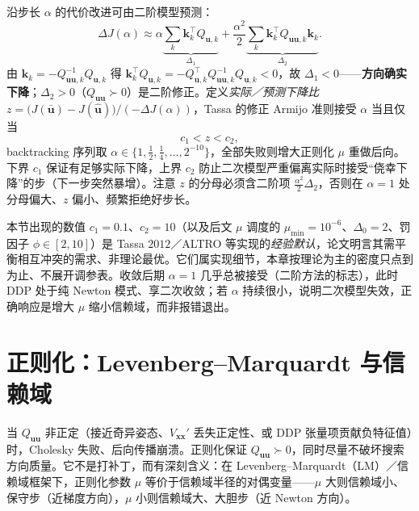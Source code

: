 沿步长 $\alpha$ 的代价改进可由二阶模型预测：
\begin{equation}
  \Delta J(\alpha)\approx\alpha\underbrace{\textstyle\sum_k\mathbf{k}_k^\top Q_{\mathbf{u},k}}_{\Delta_1}+\frac{\alpha^2}{2}\underbrace{\textstyle\sum_k\mathbf{k}_k^\top Q_{\mathbf{uu},k}\mathbf{k}_k}_{\Delta_2}.
  \label{eq:ddp-deltaJ}
\end{equation}
由 $\mathbf{k}_k=-Q_{\mathbf{uu},k}^{-1}Q_{\mathbf{u},k}$ 得 $\mathbf{k}_k^\top Q_{\mathbf{u},k}=-Q_{\mathbf{u},k}^\top Q_{\mathbf{uu},k}^{-1}Q_{\mathbf{u},k}<0$，故 $\Delta_1<0$——\textbf{方向确实下降}；$\Delta_2>0$（$Q_{\mathbf{uu}}\succ0$）是二阶修正。定义\emph{实际／预测下降比} $z=\big(J(\bar{\mathbf{u}})-J(\hat{\mathbf{u}})\big)/(-\Delta J(\alpha))$，Tassa 的修正 Armijo 准则\cite{tassa2012ilqg}接受 $\alpha$ 当且仅当
\begin{equation}
  c_1<z<c_2,
  \label{eq:ddp-armijo}
\end{equation}
backtracking 序列取 $\alpha\in\{1,\tfrac12,\tfrac14,\dots,2^{-10}\}$，全部失败则增大正则化 $\mu$ 重做后向。下界 $c_1$ 保证有足够实际下降，上界 $c_2$ 防止二次模型严重偏离实际时接受“侥幸下降”的步（下一步突然暴增）。注意 $z$ 的分母必须含二阶项 $\tfrac{\alpha^2}2\Delta_2$，否则在 $\alpha=1$ 处分母偏大、$z$ 偏小、频繁拒绝好步长。

\begin{remark}
本节出现的数值 $c_1=0.1$、$c_2=10$（以及后文 $\mu$ 调度的 $\mu_{\min}=10^{-6}$、$\Delta_0=2$、罚因子 $\phi\in[2,10]$）是 Tassa $2012$／ALTRO 等实现的\emph{经验默认}，论文明言其需平衡相互冲突的需求、非理论最优。它们属实现细节，本章按理论为主的密度只点到为止、不展开调参表。收敛后期 $\alpha=1$ 几乎总被接受（二阶方法的标志），此时 DDP 处于纯 Newton 模式、享二次收敛；若 $\alpha$ 持续很小，说明二次模型失效，正确响应是增大 $\mu$ 缩小信赖域，而非报错退出。
\end{remark}

\section{正则化：Levenberg--Marquardt 与信赖域}
\label{sec:ddp-reg}

当 $Q_{\mathbf{uu}}$ 非正定（接近奇异姿态、$V_{\mathbf{xx}}'$ 丢失正定性、或 DDP 张量项贡献负特征值）时，Cholesky 失败、后向传播崩溃。正则化保证 $Q_{\mathbf{uu}}\succ0$，同时尽量不破坏搜索方向质量。它不是打补丁，而有深刻含义：在 Levenberg--Marquardt（LM）／信赖域框架下，正则化参数 $\mu$ 等价于信赖域半径的对偶变量——$\mu$ 大则信赖域小、保守步（近梯度方向），$\mu$ 小则信赖域大、大胆步（近 Newton 方向）。

